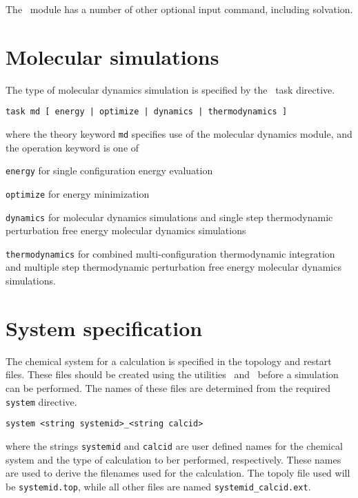 The \prepare\ module has a number of other optional input command,
including solvation.

\section{Molecular simulations}
The type of molecular dynamics simulation is specified by the
\nwchem\ task directive.
\begin{verbatim}
task md [ energy | optimize | dynamics | thermodynamics ]
\end{verbatim}
where the theory keyword {\tt md} specifies use of the molecular
dynamics module, and the operation keyword is one of
\begin{description}
\item
{\tt energy} for single configuration energy evaluation
\item
{\tt optimize} for energy minimization
\item
{\tt dynamics} for molecular dynamics simulations and single step
thermodynamic perturbation free energy molecular dynamics simulations
\item
{\tt thermodynamics} for combined multi-configuration thermodynamic
integration and multiple step thermodynamic perturbation free
energy molecular dynamics simulations.
\end{description}

\section{System specification}

The chemical system for a calculation is specified in the topology
and restart files. These files should be created using the utilities
\nwtop\ and \nwrst\ before a simulation can be performed.
The names of these files are determined from the required \verb+system+ 
directive.

\begin{verbatim}
system <string systemid>_<string calcid>
\end{verbatim}

where the strings \verb+systemid+ and \verb+calcid+ are user defined names
for the chemical system and the type of calculation to ber performed, 
respectively. These names are used to derive the filenames used for the
calculation. The topoly file used will be \verb+systemid.top+, while all
other files are named \verb+systemid_calcid.ext+.

